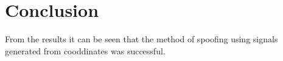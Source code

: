 
\chapter{Conclusion} %

\label{Chapter7} %

From the results it can be seen that the method of spoofing using signals generated from cooddinates was successful. 